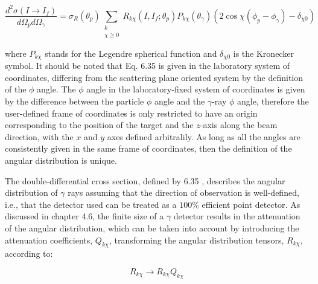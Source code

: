 \documentclass[10pt]{article}
\begin{document}
\begin{equation*}
\frac{d^{2} \sigma\left(I \rightarrow I_{f}\right)}{d \Omega_{p} d \Omega_{\gamma}}=\sigma_{R}\left(\theta_{p}\right) \sum_{\substack{k \\ \chi \geq 0}} R_{k \chi}\left(I, I_{f} ; \theta_{p}\right) P_{k \chi}\left(\theta_{\gamma}\right)\left(2 \cos \chi\left(\phi_{p}-\phi_{\gamma}\right)-\delta_{\chi 0}\right) \tag{6.35}
\end{equation*}


where $P_{k \chi}$ stands for the Legendre spherical function and $\delta_{\chi 0}$ is the Kronecker symbol. It should be noted that Eq. 6.35 is given in the laboratory system of coordinates, differing from the scattering plane oriented system by the definition of the $\phi$ angle. The $\phi$ angle in the laboratory-fixed system of coordinates is given by the difference between the particle $\phi$ angle and the $\gamma$-ray $\phi$ angle, therefore the user-defined frame of coordinates is only restricted to have an origin corresponding to the position of the target and the $z$-axis along the beam direction, with the $x$ and $y$ axes defined arbitralily. As long as all the angles are consistently given in the same frame of coordinates, then the definition of the angular distribution is unique.

The double-differential cross section, defined by 6.35 , describes the angular distribution of $\gamma$ rays assuming that the direction of observation is well-defined, i.e., that the detector used can be treated as a $100 \%$ efficient point detector. As discussed in chapter 4.6, the finite size of a $\gamma$ detector results in the attenuation of the angular distribution, which can be taken into account by introducing the attenuation coefficients, $Q_{k \chi}$, transforming the angular distribution tensors, $R_{k \chi}$, according to:


\begin{equation*}
R_{k \chi} \rightarrow R_{k \chi} Q_{k \chi} \tag{6.36}
\end{equation*}
\end{document}

